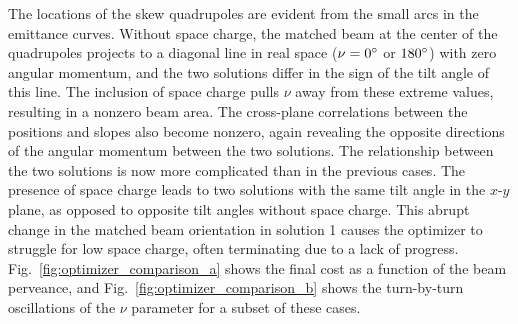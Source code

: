 %
The locations of the skew quadrupoles are evident from the small arcs in the emittance curves. Without space charge, the matched beam at the center of the quadrupoles projects to a diagonal line in real space ($\nu = 0\degree$ or $180\degree$) with zero angular momentum, and the two solutions differ in the sign of the tilt angle of this line. The inclusion of space charge pulls $\nu$ away from these extreme values, resulting in a nonzero beam area. The cross-plane correlations between the positions and slopes also become nonzero, again revealing the opposite directions of the angular momentum between the two solutions. 
The relationship between the two solutions is now more complicated than in the previous cases. The presence of space charge leads to two solutions with the same tilt angle in the $x$-$y$ plane, as opposed to opposite tilt angles without space charge. This abrupt change in the matched beam orientation in solution 1 causes the optimizer to struggle for low space charge, often terminating due to a lack of progress. Fig.~\ref{fig:optimizer_comparison_a} shows the final cost as a function of the beam perveance, and Fig.~\ref{fig:optimizer_comparison_b} shows the turn-by-turn oscillations of the $\nu$ parameter for a subset of these cases. 
%
